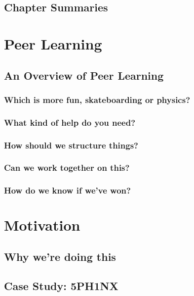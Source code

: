 \documentclass[ebook, 12pt, twoside]{memoir}
\begin{document}
\chapter[\textbf{Chapter Summaries}]{Chapter Summaries}
%


\part{Peer Learning} \label{peer-learning-part} %
%
\chapter[\textbf{An Overview}]{An Overview of Peer Learning}
%

%
\section*{Which is more fun, skateboarding or physics?}

%
\section*{What kind of help do you need?}

%
\section*{How should we structure things?}

%
\section*{Can we work together on this?}

%
\section*{How do we know if we've won?}



\part{Motivation} \label{motivation-part} %
%
\chapter[\textbf{Why we're doing this}]{Why we're doing this}

%
\chapter[\textbf{Case Study: 5PH1NX}]{Case Study: 5PH1NX}\label{sphinx-beginning}
%

\end{document}
